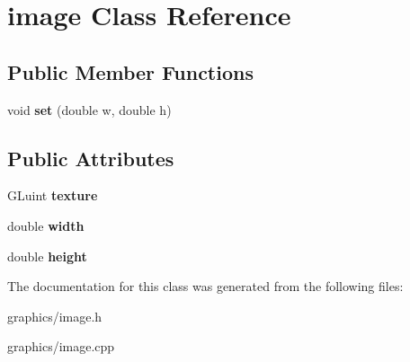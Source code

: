 \hypertarget{classimage}{\section{image Class Reference}
\label{classimage}
}
\subsection*{Public Member Functions}
\begin{DoxyCompactItemize}
\item 
\hypertarget{classimage_ad3deabe394df3be29ced218a5418ef93}{void {\bfseries set} (double w, double h)}\label{classimage_ad3deabe394df3be29ced218a5418ef93}

\end{DoxyCompactItemize}
\subsection*{Public Attributes}
\begin{DoxyCompactItemize}
\item 
\hypertarget{classimage_a2149b2f939021143e2b0e3b43e3ceccc}{G\+Luint {\bfseries texture}}\label{classimage_a2149b2f939021143e2b0e3b43e3ceccc}

\item 
\hypertarget{classimage_a39bbf81bc2b2938f8901fbe3f1fece17}{double {\bfseries width}}\label{classimage_a39bbf81bc2b2938f8901fbe3f1fece17}

\item 
\hypertarget{classimage_a095abf5df0b468ad5484d252a4d7cead}{double {\bfseries height}}\label{classimage_a095abf5df0b468ad5484d252a4d7cead}

\end{DoxyCompactItemize}


The documentation for this class was generated from the following files\+:\begin{DoxyCompactItemize}
\item 
graphics/image.\+h\item 
graphics/image.\+cpp\end{DoxyCompactItemize}
